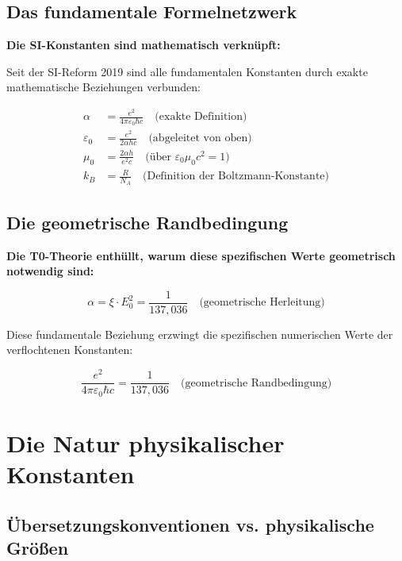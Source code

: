 \documentclass[12pt,a4paper]{article}
\begin{document}
\subsection{Das fundamentale Formelnetzwerk}

\begin{derivation}
\textbf{Die SI-Konstanten sind mathematisch verkn{\"u}pft:}

Seit der SI-Reform 2019 sind alle fundamentalen Konstanten durch exakte mathematische Beziehungen verbunden:

\begin{align}
\alpha &= \frac{e^2}{4\pi\varepsilon_0\hbar c} \quad \text{(exakte Definition)} \\
\varepsilon_0 &= \frac{e^2}{2\alpha h c} \quad \text{(abgeleitet von oben)} \\
\mu_0 &= \frac{2\alpha h}{e^2 c} \quad \text{({\"u}ber } \varepsilon_0\mu_0c^2 = 1) \\
k_B &= \frac{R}{N_A} \quad \text{(Definition der Boltzmann-Konstante)}
\end{align}
\end{derivation}

\subsection{Die geometrische Randbedingung}

\begin{insight}
\textbf{Die T0-Theorie enth{\"u}llt, warum diese spezifischen Werte geometrisch notwendig sind:}

\begin{equation}
\alpha = \xi \cdot E_0^2 = \frac{1}{137{,}036} \quad \text{(geometrische Herleitung)}
\end{equation}

Diese fundamentale Beziehung erzwingt die spezifischen numerischen Werte der verflochtenen Konstanten:

\begin{equation}
\frac{e^2}{4\pi\varepsilon_0\hbar c} = \frac{1}{137{,}036} \quad \text{(geometrische Randbedingung)}
\end{equation}
\end{insight}

\section{Die Natur physikalischer Konstanten}

\subsection{{\"U}bersetzungskonventionen vs. physikalische Gr{\"o}{\ss}en}
\end{document}
